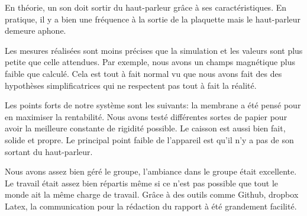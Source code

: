 

En théorie, un son doit sortir du haut-parleur grâce à ses caractéristiques.  En pratique, il y a bien une fréquence
à la sortie de la plaquette mais le haut-parleur demeure aphone.

Les mesures réalisées sont moins précises que la simulation et les valeurs sont plus petite que celle attendues.  Par exemple, 
nous avons un champs magnétique plus faible que calculé.  Cela est tout à fait normal vu que nous avons fait des des hypothèses
simplificatrices qui ne respectent pas tout à fait la réalité.

Les points forts de notre système sont les suivants: la membrane a été pensé pour en maximiser la rentabilité. 
Nous avons testé différentes sortes de papier pour avoir la meilleure constante de rigidité possible.  Le caisson est
aussi bien fait, solide et propre.
Le principal point faible de l'appareil est qu'il n'y a pas de son sortant du haut-parleur.

Nous avons assez bien géré le groupe, l'ambiance dans le groupe était excellente.  Le travail était assez bien répartis
même si ce n'est pas possible que tout le monde ait la même charge de travail.  Grâce à des outils comme Github, dropbox 
Latex, la communication pour la rédaction du rapport à été grandement facilité.



